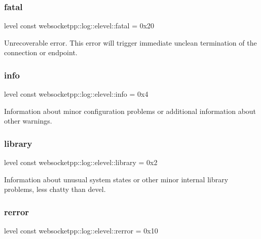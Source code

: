 \subsubsection{\texorpdfstring{fatal}{fatal}}
{\footnotesize\ttfamily level const websocketpp\+::log\+::elevel\+::fatal = 0x20\hspace{0.3cm}{\ttfamily [static]}}

Unrecoverable error. This error will trigger immediate unclean termination of the connection or endpoint. \mbox{\label{structwebsocketpp_1_1log_1_1elevel_a3ab47987a682f0de7b1d0df8c9c3b9d2}} 
\subsubsection{\texorpdfstring{info}{info}}
{\footnotesize\ttfamily level const websocketpp\+::log\+::elevel\+::info = 0x4\hspace{0.3cm}{\ttfamily [static]}}

Information about minor configuration problems or additional information about other warnings. \mbox{\label{structwebsocketpp_1_1log_1_1elevel_a2b862d4f143d9b77619ddbacd1763674}} 
\subsubsection{\texorpdfstring{library}{library}}
{\footnotesize\ttfamily level const websocketpp\+::log\+::elevel\+::library = 0x2\hspace{0.3cm}{\ttfamily [static]}}

Information about unusual system states or other minor internal library problems, less chatty than devel. \mbox{\label{structwebsocketpp_1_1log_1_1elevel_ae8a9a9f8b1fa45a731acd340e10aa342}} 
\subsubsection{\texorpdfstring{rerror}{rerror}}
{\footnotesize\ttfamily level const websocketpp\+::log\+::elevel\+::rerror = 0x10\hspace{0.3cm}{\ttfamily [static]}}

